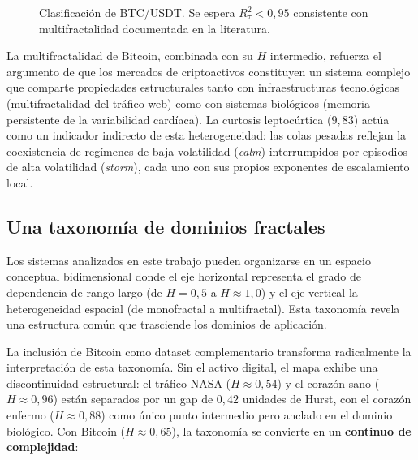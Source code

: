\begin{figure}[H]
    \centering
    \caption{Clasificación de BTC/USDT. Se espera $R^2_{\tau} < 0{,}95$
             consistente con multifractalidad documentada en la literatura.}
    \label{fig:btc-clasif}
\end{figure}

La multifractalidad de Bitcoin, combinada con su $H$ intermedio, refuerza el
argumento de que los mercados de criptoactivos constituyen un sistema complejo
que comparte propiedades estructurales tanto con infraestructuras tecnológicas
(multifractalidad del tráfico web) como con sistemas biológicos (memoria
persistente de la variabilidad cardíaca). La curtosis leptocúrtica ($9{,}83$)
actúa como un indicador indirecto de esta heterogeneidad: las colas pesadas
reflejan la coexistencia de regímenes de baja volatilidad (\textit{calm})
interrumpidos por episodios de alta volatilidad (\textit{storm}), cada uno con
sus propios exponentes de escalamiento local.

\subsection{Una taxonomía de dominios fractales}

Los sistemas analizados en este trabajo pueden organizarse en un espacio
conceptual bidimensional donde el eje horizontal representa el grado de
dependencia de rango largo (de $H=0{,}5$ a $H\approx1{,}0$) y el eje vertical
la heterogeneidad espacial (de monofractal a multifractal). Esta taxonomía
revela una estructura común que trasciende los dominios de aplicación.

La inclusión de Bitcoin como dataset complementario transforma radicalmente la
interpretación de esta taxonomía. Sin el activo digital, el mapa exhibe una
discontinuidad estructural: el tráfico NASA ($H \approx 0{,}54$) y el corazón
sano ($H \approx 0{,}96$) están separados por un gap de $0{,}42$ unidades de
Hurst, con el corazón enfermo ($H \approx 0{,}88$) como único punto
intermedio pero anclado en el dominio biológico. Con Bitcoin ($H \approx 0{,}65$),
la taxonomía se convierte en un \textbf{continuo de complejidad}:

